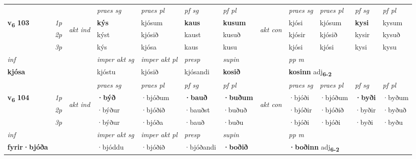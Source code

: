 \begin{longtable}[l]{X>{\footnotesize\itshape}llXXXXlXXXX}
 & &   & \textit{praes sg}  & \textit{praes pl}    & \textit{ pf sg} & \textit{pf pl} & & \textit{praes sg}  & \textit{praes pl}    & \textit{pf sg} & \textit{pf pl }  \\ \cmidrule{4-7} \cmidrule{9-12}
 \multirow{2}{*}{{{\textbf{v{\textsubscript{6}}} \Large{\textbf{103}}}}}  & 1p & \multirow{3}{*}{\begin{turn}{90}\textit{akt ind}\end{turn}} & \textbf{kýs} & kjósum & \textbf{kaus} & \textbf{kusum} & \multirow{3}{*}{\begin{turn}{90}\textit{akt con}\end{turn}} &kjósi & kjósum & \textbf{kysi} & kysum\\*
 & 2p &  &  kýst  & kjósið & kaust & kusuð & & kjósir & kjósið & kysir & kysuð \\*
 & 3p &  & kýs & kjósa & kaus & kusu & & kjósi & kjósi& kysi & kysu \\*
\cmidrule{4-7} \cmidrule{9-12}

   {\textit{inf}} & &  & \textit{imper akt sg} & \textit{imper akt pl}   & \textit{presp} & \textit{supin}  && \textit{pp m} \\*
  {\textbf{kjósa}} & && kjóstu  & kjósið   & kjósandi &  \textbf{kosið}  && \multicolumn{2}{l}{\textbf{kosinn} adj\textbf{\textsubscript{6-2}}} \\*

\midrule

 & &   & \textit{praes sg}  & \textit{praes pl}    & \textit{ pf sg} & \textit{pf pl} & & \textit{praes sg}  & \textit{praes pl}    & \textit{pf sg} & \textit{pf pl }  \\ \cmidrule{4-7} \cmidrule{9-12}
 \multirow{2}{*}{{{\textbf{v{\textsubscript{6}}} \Large{\textbf{104}}}}}  & 1p & \multirow{3}{*}{\begin{turn}{90}\textit{akt ind}\end{turn}} & \textbf{·býð} & ·bjóðum & \textbf{·bauð} & \textbf{·buðum} & \multirow{3}{*}{\begin{turn}{90}\textit{akt con}\end{turn}} &·bjóði & ·bjóðum & \textbf{·byði} & ·byðum\\*
 & 2p &  &  ·býður  & ·bjóðið & ·bauðst & ·buðuð & & ·bjóðir & ·bjóðið & ·byðir & ·byðuð \\*
 & 3p &  & ·býður & ·bjóða & ·bauð & ·buðu & & ·bjóði & ·bjóði& ·byði & ·byðu \\*
\cmidrule{4-7} \cmidrule{9-12}

   {\textit{inf}} & &  & \textit{imper akt sg} & \textit{imper akt pl}   & \textit{presp} & \textit{supin}  && \textit{pp m} \\*
  {\textbf{fyrir\allowbreak ·bjóða}} & && ·bjóddu  & ·bjóðið   & ·bjóðandi &  \textbf{·boðið}  && \multicolumn{2}{l}{\textbf{·boðinn} adj\textbf{\textsubscript{6-2}}} \\*


\end{longtable}
